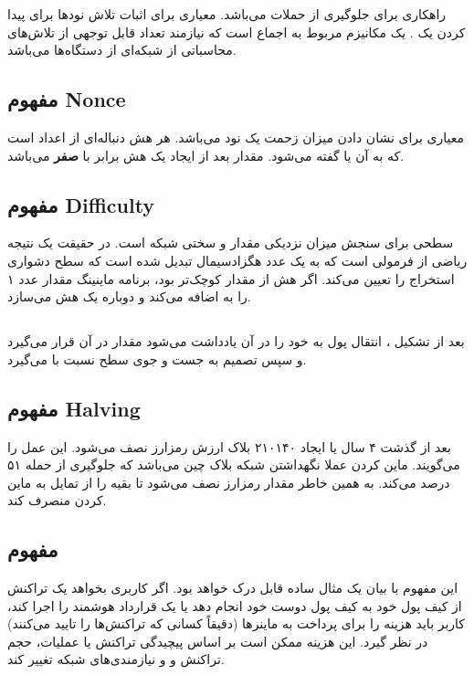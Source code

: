 \documentclass[10pt, a4paper]{article}
\begin{document}
راهکاری برای جلوگیری از حملات  می‌باشد. معیاری برای اثبات تلاش نود‌ها
برای پیدا کردن یک . یک مکانیزم مربوط به اجماع است که نیازمند تعداد
قابل توجهی از تلاش‌های محاسباتی از شبکه‌ای از دستگاه‌ها می‌باشد.

\subsection{مفهوم Nonce}

معیاری برای نشان دادن میزان زحمت یک نود می‌باشد. هر هش دنباله‌ای از اعداد است که
به آن  یا  گفته می‌شود. مقدار  بعد از
ایجاد یک هش برابر با \textbf{صفر} می‌باشد.

\subsection{مفهوم Difficulty}

سطحی برای سنجش میزان نزدیکی مقدار  و سختی شبکه است. در حقیقت یک نتیجه
ریاضی از فرمولی است که به یک عدد هگزادسیمال تبدیل شده است که سطح دشواری استخراج
را تعیین می‌کند. اگر هش از مقدار  کوچک‌تر بود، برنامه ماینینگ
مقدار عدد ۱ را به  اضافه می‌کند و دوباره یک هش می‌سازد.

\subsection{}

بعد از تشکیل ، انتقال پول به خود را در آن یادداشت می‌شود مقدار
 در آن قرار می‌گیرد و سپس تصمیم به جست و جوی سطح 
نسبت با  می‌گیرد.

\subsection{مفهوم Halving}

بعد از گذشت ۴ سال یا ایجاد ۲۱۰۱۴۰ بلاک ارزش رمزارز نصف می‌شود. این عمل را
 می‌گویند. ماین کردن عملا نگهداشتن شبکه بلاک چین می‌باشد که جلوگیری
از حمله ۵۱ درصد می‌کند. به همین خاطر مقدار رمزارز نصف می‌شود تا بقیه را از تمایل
به ماین کردن منصرف کند.

\subsection{مفهوم }

این مفهوم با بیان یک مثال ساده قابل درک خواهد بود. اگر کاربری بخواهد یک تراکنش
از کیف پول خود به کیف پول دوست خود انجام دهد یا یک قرارداد هوشمند را اجرا کند،
کاربر باید هزینه  را برای پرداخت به ماینر‌ها (دقیقاً کسانی که
تراکنش‌ها را تایید می‌کنند) در نظر گیرد. این هزینه ممکن است بر اساس پیچیدگی
تراکنش یا عملیات، حجم تراکنش و و نیازمندی‌های شبکه تغییر کند.
\end{document}
